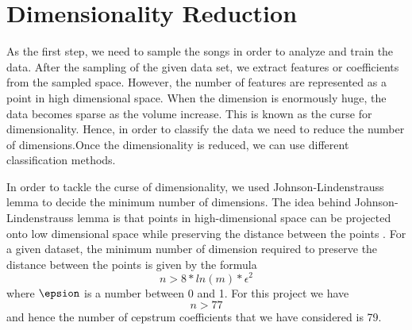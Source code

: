 \documentclass[12pt]{article}
\begin{document}
\section{Dimensionality Reduction}\label{dr}
As the first step, we need to sample the songs in order to analyze and train the data. After the sampling of the given data set, we extract features or coefficients from the sampled space. However, the number of features are represented as a point in high dimensional space. When the dimension is enormously huge, the data becomes sparse as the volume increase. This is known as the curse for dimensionality. Hence, in order to classify the data we need to reduce the number of dimensions.Once the dimensionality is reduced, we can use different classification methods.

In order to tackle the curse of dimensionality, we used Johnson-Lindenstrauss lemma to decide the minimum number of dimensions. The idea behind Johnson-Lindenstrauss lemma is that points in high-dimensional space can be projected onto low dimensional space while preserving the distance between the points \cite{dasgupta}. For a given dataset, the minimum number of dimension required to preserve the distance between the points is given by the formula $$ n > 8 * ln(m) * \epsilon ^ 2 $$ where $\epsion$ is a number between 0 and 1. For this project we have $$ n > 77$$ and hence the number of cepstrum coefficients that we have considered is 79.
\end{document}
